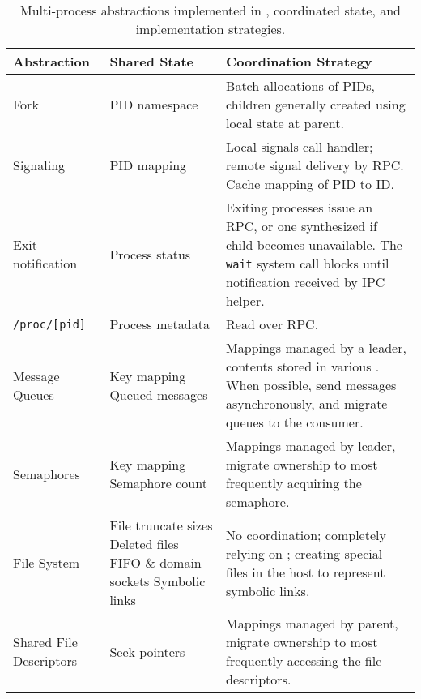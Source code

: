 \begin{table}
\footnotesize
\centering
\begin{tabular}{|p{}|p{}|p{}|}
\hline
{\bf Ab\-strac\-tion} & {\bf Shared State} & {\bf Coordination Strategy} \\
\hline
Fork & 
\raggedright
PID namespace & Batch allocations of PIDs, children generally created using local state at parent.  \\
\hline
Signaling & PID mapping & Local signals call handler; remote signal delivery by RPC.  Cache mapping of PID to \picoproc{} ID. \\
\hline
\raggedright
Exit notification & 
\raggedright
Process status  & Exiting processes issue an RPC, or one synthesized if child becomes unavailable.  The {\tt wait} system call blocks until notification received by IPC helper. \\
\hline
{\tt /proc/[pid]} & Process metadata & Read over RPC.  \\
\hline
Message Queues & 
\raggedright
Key mapping \newline
Queued messages &
Mappings managed by a leader, contents stored in various \picoprocs{}.  When possible, send messages asynchronously, and migrate queues to the consumer.\\
\hline
Semaphores & 
\raggedright
Key mapping \newline
Semaphore count &
Mappings managed by leader, migrate ownership to \picoproc{} most frequently acquiring the semaphore. \\
\hline
\raggedright
File System & 
\raggedright
File truncate sizes \newline
Deleted files \newline
FIFO \& domain sockets \newline
Symbolic links
& No coordination; completely relying on \thehostabi{}; creating special files in the host to represent symbolic links. \\
\hline
\raggedright
Shared File Descriptors & 
\raggedright
Seek pointers & Mappings managed by parent, migrate ownership to \picoproc{} most frequently accessing the file descriptors. \\
\hline
\end{tabular}
\caption[Multi-process abstractions implemented in sysname{}]
{Multi-process abstractions implemented in \graphene{}, coordinated state, and implementation strategies.}
\label{tab:libos:multiproc}
\end{table}


